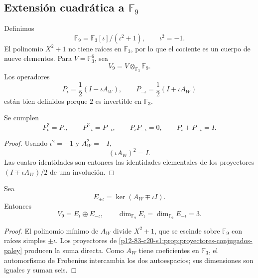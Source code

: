 \subsection{Extensión cuadrática a \texorpdfstring{\(\mathbb F_9\)}{F₉}}

Definimos
\begin{equation}
 \mathbb F_9=\mathbb F_3[\iota]/(\iota^2+1),
 \qquad \iota^2=-1.
 \label{p12-83-c20-s1:eq:definicion-f9-autonoma}
\end{equation}
El polinomio \(X^2+1\) no tiene raíces en \(\mathbb F_3\), por lo que el
cociente es un cuerpo de nueve elementos. Para
\(V=\mathbb F_3^6\), sea
\[
 V_9=V\otimes_{\mathbb F_3}\mathbb F_9.
\]
Los operadores
\begin{equation}
 P_\iota=\frac12(I-\iota A_W),
 \qquad
 P_{-\iota}=\frac12(I+\iota A_W)
 \label{p12-83-c20-s1:eq:proyectores-f9-paley}
\end{equation}
están bien definidos porque \(2\) es invertible en \(\mathbb F_3\).

\begin{proposition}
\label{p12-83-c20-s1:prop:proyectores-conjugados-paley}
Se cumplen
\[
 P_\iota^2=P_\iota,
 \qquad
 P_{-\iota}^2=P_{-\iota},
 \qquad
 P_\iota P_{-\iota}=0,
 \qquad
 P_\iota+P_{-\iota}=I.
\]
\end{proposition}

\begin{proof}
Usando \(\iota^2=-1\) y \(A_W^2=-I\),
\[
 (\iota A_W)^2=I.
\]
Las cuatro identidades son entonces las identidades elementales de los
proyectores \((I\mp\iota A_W)/2\) de una involución.
\end{proof}

\begin{theorem}
\label{p12-83-c20-s1:thm:descomposicion-espectral-f9-paley}
Sea
\[
 E_{\pm\iota}=\ker(A_W\mp\iota I).
\]
Entonces
\begin{equation}
 V_9=E_\iota\oplus E_{-\iota},
 \qquad
 \dim_{\mathbb F_9}E_\iota
 =\dim_{\mathbb F_9}E_{-\iota}=3.
 \label{p12-83-c20-s1:eq:descomposicion-espectral-f9-paley}
\end{equation}
\end{theorem}

\begin{proof}
El polinomio mínimo de \(A_W\) divide \(X^2+1\), que se escinde sobre
\(\mathbb F_9\) con raíces simples \(\pm\iota\). Los proyectores de
\cref{p12-83-c20-s1:prop:proyectores-conjugados-paley} producen la suma directa. Como
\(A_W\) tiene coeficientes en \(\mathbb F_3\), el automorfismo de
Frobenius intercambia los dos autoespacios; sus dimensiones son iguales y
suman seis.
\end{proof}

